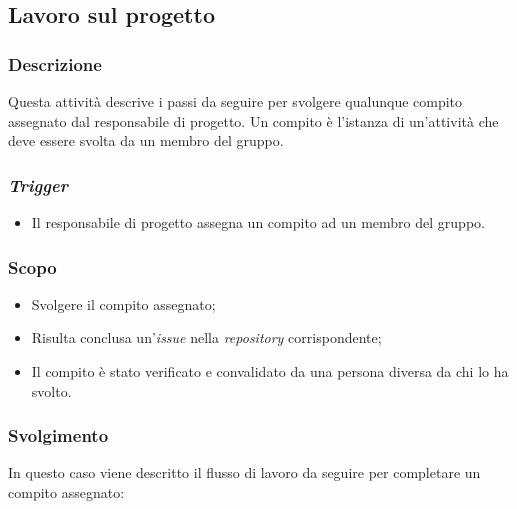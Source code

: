 \subsection{Lavoro sul progetto}
\label{lavoro-sul-progetto}

\subsubsection{Descrizione}
Questa attività descrive i passi da seguire per svolgere qualunque compito
assegnato dal responsabile di progetto. Un compito è l'istanza di un'attività
che deve essere svolta da un membro del gruppo.


\subsubsection{\textit{Trigger}}
\begin{itemize}
	\item Il responsabile di progetto assegna un compito ad un membro del
	      gruppo.
\end{itemize}

\subsubsection{Scopo}
\begin{itemize}
	\item Svolgere il compito assegnato;
	\item Risulta conclusa un'\textit{issue\g} nella \textit{repository\g}
	      corrispondente;
	\item Il compito è stato verificato e convalidato da una persona diversa
	      da chi lo ha svolto.
\end{itemize}

\subsubsection{Svolgimento}
In questo caso viene descritto il flusso di lavoro da seguire per completare
un compito assegnato:

